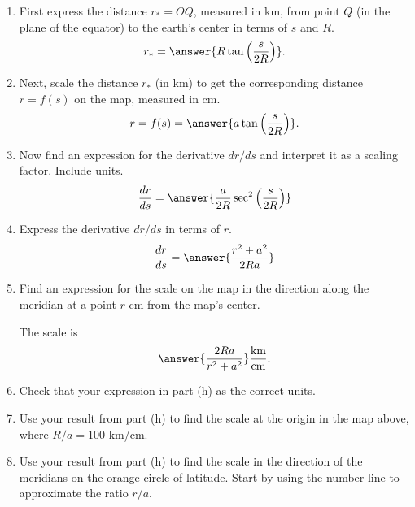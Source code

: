\documentclass{ximera}
\begin{document}
\begin{question}
\begin{enumerate}
The worksheet below shows a cross-section of the earth through the north and south poles. The point $P$ is $s$ km from the north pole.

\begin{onlineOnly}
    \begin{center}
\end{center}
\end{onlineOnly}

\href{https://www.desmos.com/calculator/ncskufxsk3}{151: Stereo Proj 2D2}

\item First express the distance $r_* = OQ$, measured in km, from point $Q$ (in the plane of the equator) to the earth's center in terms of $s$ and $R$. 
\[
 r_* = \answer{R\tan\left( \frac{s}{2R} \right)} .
\]

\item Next, scale the distance $r_*$ (in km) to get the corresponding distance $r=f(s)$ on the map, measured in cm.
\[
  r = f(s) = \answer{a \tan\left( \frac{s}{2R} \right) }.
\]

\item Now find an expression for the derivative $dr/ds$ and interpret it as a scaling factor. Include units.
\[
   \frac{dr}{ds} = \answer{\frac{a}{2R}\sec^2 \left( \frac{s}{2R} \right)}
\]

\item Express the derivative $dr/ds$ in terms of $r$.
\[
   \frac{dr}{ds} =   \answer{\frac{r^2 + a^2}{2Ra}}                          %
\]

\item Find an expression for the scale on the map in the direction along the meridian at a point $r$ cm from the map's center.

The scale is
\[
 \answer{\frac{2Ra}{r^2 + a^2}} \frac{\text{km}}{\text{cm}} .
\]

\item Check that your expression in part (h) as the correct units.


\item Use your result from part (h) to find the scale at the origin in the map above, where $R/a = 100$ km/cm.

\item Use your result from part (h) to find the scale in the direction of the meridians on the orange circle of latitude. Start by using the number line to approximate the ratio $r/a$. 

\end{enumerate}


\end{question}
\end{document}
